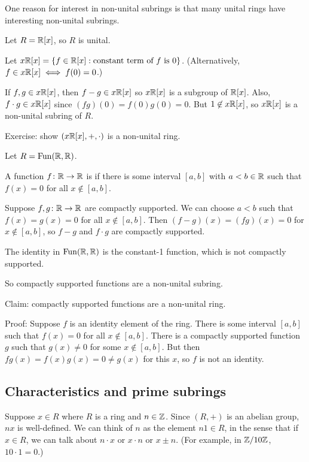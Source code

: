 \documentclass[12pt,letterpaper]{report}
\begin{document}
One reason for interest in non-unital subrings is that many unital rings have interesting
non-unital subrings.

\begin{ex}
  Let $R = \mathbb{R}[x]$, so $R$ is unital.

  Let $x\mathbb{R}[x] = \{f \in \mathbb{R}[x] : \text{constant term of } f \text{ is } 0\}$.
  (Alternatively, $f \in x\mathbb{R}[x] \iff f(0) = 0$.)

  If $f, g \in x\mathbb{R}[x]$, then $f - g \in x\mathbb{R}[x]$ so $x\mathbb{R}[x]$ is a subgroup
  of $\mathbb{R}[x]$.
  Also, $f \cdot g \in x\mathbb{R}[x]$ since $(fg)(0) = f(0)g(0) = 0$.
  But $1 \not\in x\mathbb{R}[x]$, so $x\mathbb{R}[x]$ is a non-unital subring of $R$.

  Exercise: show $(x\mathbb{R}[x], +, \cdot)$ is a non-unital ring.
\end{ex}

\begin{ex}
  Let $R = \operatorname{Fun}(\mathbb{R}, \mathbb{R})$.

  A function $f \colon \mathbb{R} \to \mathbb{R}$ is  if there is some interval $[a, b]$
  with $a < b \in \mathbb{R}$ such that $f(x) = 0$ for all $x \not\in [a, b]$.

  Suppose $f, g \colon \mathbb{R} \to \mathbb{R}$ are compactly supported.
  We can choose $a < b$ such that $f(x) = g(x) = 0$ for all $x \not\in [a, b]$.
  Then $(f - g)(x) = (fg)(x) = 0$ for $x \not\in [a, b]$, so $f - g$ and $f \cdot g$ are compactly
  supported.

  The identity in $\operatorname{Fun}(\mathbb{R}, \mathbb{R})$ is the constant-1 function, which is not compactly supported.

  So compactly supported functions are a non-unital subring.

  Claim: compactly supported functions are a non-unital ring.

  Proof: Suppose $f$ is an identity element of the ring.
  There is some interval $[a, b]$ such that $f(x) = 0$ for all $x \not\in [a, b]$.
  There is a compactly supported function $g$ such that $g(x) \neq 0$ for some $x \not\in [a, b]$.
  But then $fg(x) = f(x)g(x) = 0 \neq g(x)$ for this $x$, so $f$ is not an identity.
\end{ex}

\pagebreak
\subsection{Characteristics and prime subrings}

Suppose $x \in R$ where $R$ is a ring and $n \in \mathbb{Z}$.
Since $(R, +)$ is an abelian group, $nx$ is well-defined.
We can think of $n$ as the element $n1 \in R$, in the sense that if $x \in R$, we can talk about
$n \cdot x$ or $x \cdot n$ or $x \pm n$.
(For example, in $\mathbb{Z}/{10}\mathbb{Z}$, $10 \cdot 1 = 0$.)
\end{document}
